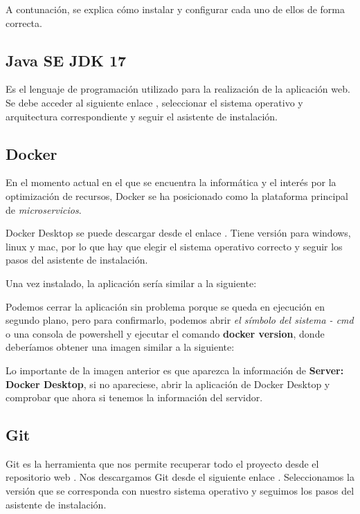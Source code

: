 A contunación, se explica cómo instalar y configurar cada uno de ellos de forma correcta.

\subsection{Java SE JDK 17}

Es el lenguaje de programación utilizado para la realización de la aplicación web.
Se debe acceder al siguiente enlace \cite{web:JavaJDK}, seleccionar el sistema operativo y arquitectura correspondiente y seguir el asistente de instalación.

\subsection{Docker}

En el momento actual en el que se encuentra la informática y el interés por la optimización de recursos, Docker se ha posicionado como la plataforma principal de \textit{microservicios}.

Docker Desktop se puede descargar desde el enlace \cite{web:dockerDesktop}. Tiene versión para windows, linux y mac, por lo que hay que elegir el sistema operativo correcto y seguir los pasos del asistente de instalación.

Una vez instalado, la aplicación sería similar a la siguiente:

Podemos cerrar la aplicación sin problema porque se queda en ejecución en segundo plano, pero para confirmarlo, podemos abrir \textit{el símbolo del sistema - cmd} o una consola de powershell y ejecutar el comando \textbf{docker version}, donde deberíamos obtener una imagen similar a la siguiente:

Lo importante de la imagen anterior es que aparezca la información de \textbf{Server: Docker Desktop}, si no apareciese, abrir la aplicación de Docker Desktop y comprobar que ahora si tenemos la información del servidor.

\subsection{Git}

Git es la herramienta que nos permite recuperar todo el proyecto desde el repositorio web \cite{github:proyect}. 
Nos descargamos Git desde el siguiente enlace \cite{web:git}.
Seleccionamos la versión que se corresponda con nuestro sistema operativo y seguimos los pasos del asistente de instalación.

